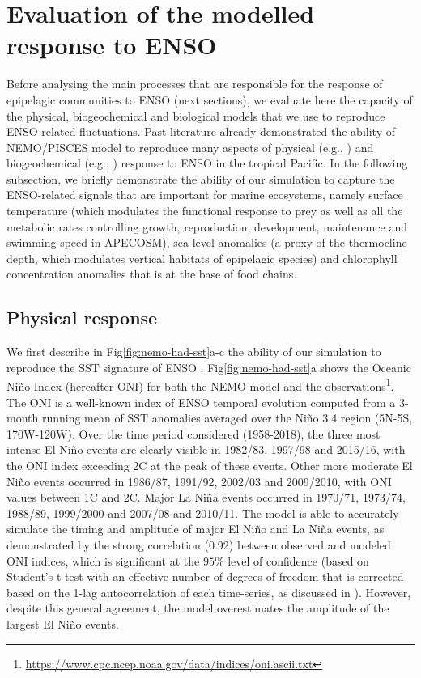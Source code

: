 \section{Evaluation of the modelled response to ENSO}
\label{sec:model-val}

Before analysing the main processes that are responsible for the response of epipelagic communities to ENSO (next sections), we evaluate here the capacity of the physical, biogeochemical and biological models that we use to reproduce ENSO-related fluctuations. Past literature already demonstrated the ability of NEMO/PISCES model to reproduce many aspects of physical (e.g., \citealt{vialardModelStudyOceanic2001, lengaigneOceanResponseMarch2002}) and biogeochemical (e.g., \citealt{ masottiLargescaleShiftsPhytoplankton2011}) response to ENSO in the tropical Pacific. In the following subsection, we briefly demonstrate the ability of our simulation to capture the ENSO-related signals that are important for marine ecosystems, namely surface temperature (which modulates the functional response to prey as well as all the metabolic rates controlling growth, reproduction, development, maintenance and swimming speed in APECOSM), sea-level anomalies (a proxy of the thermocline depth, which modulates vertical habitats of epipelagic species) and chlorophyll concentration anomalies that is at the base of food chains.

\subsection{Physical response}

We first describe in Fig\ref{fig:nemo-had-sst}a-c the ability of our simulation to reproduce the SST signature of ENSO \citep{drushkaProcessesDrivingIntraseasonal2015, puyModulationEquatorialPacific2019, gorguesRevisitingNina19982010, martinezReconstructingGlobalChlorophylla2020}. Fig\ref{fig:nemo-had-sst}a shows the Oceanic Niño Index (hereafter ONI) for both the NEMO model and the observations\footnote{\url{https://www.cpc.ncep.noaa.gov/data/indices/oni.ascii.txt}}. The ONI is a well-known index of ENSO temporal evolution computed from a 3-month running mean of SST anomalies averaged over the Niño 3.4 region (5N-5S, 170W-120W). Over the time period considered (1958-2018), the three most intense El Niño events are clearly visible in 1982/83, 1997/98 and 2015/16, with the ONI index exceeding 2\degree{}C at the peak of these events. Other more moderate El Niño events occurred in 1986/87, 1991/92, 2002/03 and 2009/2010, with ONI values between 1\degree{}C and 2\degree{}C. Major La Niña events occurred in 1970/71, 1973/74, 1988/89, 1999/2000 and 2007/08 and 2010/11. The model is able to accurately simulate the timing and amplitude of major El Niño and La Niña events, as demonstrated by the strong correlation (0.92) between observed and modeled ONI indices, which is significant at the $95\%$ level of confidence (based on Student's t-test with an effective number of degrees of freedom that is corrected based on the 1-lag autocorrelation of each time-series, as discussed in \citealp{brethertonEffectiveNumberSpatial1999}). However, despite this general agreement, the model overestimates the amplitude of the largest El Niño events. 

